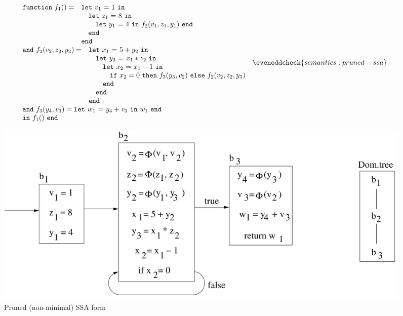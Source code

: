 \begin{figure}
\begin{equation}
\label{FunctionalConstructionProgram2}
\begin{array}{l}
  \begin{array}{ll}
    \mathtt{function}\ f_1() = 
    & \letinD {v_1} 1 {}\\
    & \quad \letinD {z_1} 8 {}\\
    & \quad \quad \letin {y_1} 4 {\call {f_2} {v_1,z_1,y_1}}\\
    & \quad \mathtt{end}\\
    & \mathtt{end}
  \end{array}\\
  \begin{array}{ll}
    \mathtt{and}\ f_2(v_2,z_2,y_2) =
    & \letinD {x_1} {5+y_2} {}\\
    & \quad \letinD {y_3} {x_1*z_2} {}\\
    & \quad \quad \letinD {x_2} {x_1-1} {}\\ 
    & \quad \quad \quad 
          {\ite {x_2=0} {\call {f_3} {y_3,v_2}} {\call {f_2} {v_2,z_2,y_3}}}\\ 
    & \quad \quad \mathtt{end}\\
    & \quad \mathtt{end}\\
    & \mathtt{end}
  \end{array}\\
  \begin{array}{l}
    \mathtt{and}\ f_3(y_4,v_3) = \letin {w_1} {y_4+v_3} {w_1}\\
    \mathtt{in}\ f_1()\ \mathtt{end}
  \end{array} 
\end{array}
  \evenoddcheck{semantics:pruned-ssa}
\end{equation}
\begin{center}
\includegraphics[scale=0.4]{SSAConstructionExample2}
\end{center}
\caption{\label{fig:FunctionalCorrespondenceRunningExampleInitialSSA} Pruned (non-minimal) SSA form}
\end{figure}


